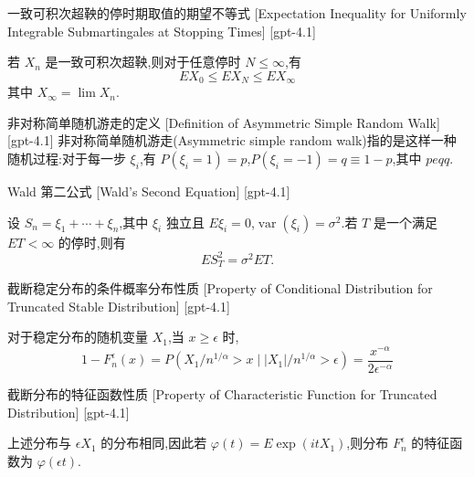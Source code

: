 \documentclass[UTF8]{ctexart}
\begin{document}
    
    
    \begin{thm}
        {一致可积次超鞅的停时期取值的期望不等式}
        [Expectation Inequality for Uniformly Integrable Submartingales at Stopping Times]
        [gpt-4.1]
        
若 $X_{n}$ 是一致可积次超鞅,则对于任意停时 $N \leq \infty$,有
\[
E X_{0} \leq E X_{N} \leq E X_{\infty}
\]
其中 $X_{\infty} = \lim X_{n}$.

    \end{thm}
    
    
    
    \begin{dfn}
        {非对称简单随机游走的定义}
        [Definition of Asymmetric Simple Random Walk]
        [gpt-4.1]
        非对称简单随机游走(Asymmetric simple random walk)指的是这样一种随机过程:对于每一步 $\xi_{i}$,有 $P(\xi_{i} = 1) = p$,$P(\xi_{i} = -1) = q \equiv 1-p$,其中 $p 
eq q$.
    \end{dfn}
    
    
    
    \begin{thm}
        {Wald 第二公式}
        [Wald's Second Equation]
        [gpt-4.1]
        
设 $S_n = \xi_1 + \cdots + \xi_n$,其中 $\xi_i$ 独立且 $E \xi_i = 0$,$\operatorname{var}(\xi_i) = \sigma^2$.若 $T$ 是一个满足 $E T < \infty$ 的停时,则有
\[
E S_T^2 = \sigma^2 E T.
\]

    \end{thm}
    
    
    
    \begin{ppt}
        {截断稳定分布的条件概率分布性质}
        [Property of Conditional Distribution for Truncated Stable Distribution]
        [gpt-4.1]
        
对于稳定分布的随机变量 $X_1$,当 $x \ge \epsilon$ 时,
\[
1 - F_{n}^{\epsilon}(x) = P(X_{1} / n^{1/\alpha} > x \mid |X_{1}| / n^{1/\alpha} > \epsilon) = \frac{x^{-\alpha}}{2 \epsilon^{-\alpha}}
\]

    \end{ppt}
    
    
    
    \begin{ppt}
        {截断分布的特征函数性质}
        [Property of Characteristic Function for Truncated Distribution]
        [gpt-4.1]
        
上述分布与 $\epsilon X_{1}$ 的分布相同,因此若 $\varphi(t) = E \exp(i t X_{1})$,则分布 $F_{n}^{\epsilon}$ 的特征函数为 $\varphi(\epsilon t)$.

    \end{ppt}
    
\end{document}
